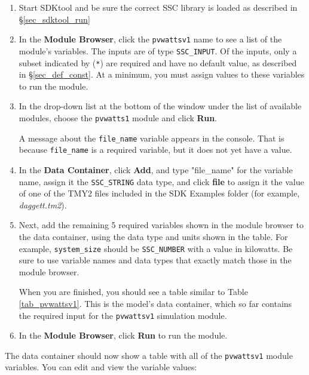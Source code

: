 \documentclass{scrartcl} %
\newcommand{\+}{\discretionary{\mbox{\scriptsize$\hookleftarrow$}}{}{}}
\begin{document}
\begin{enumerate}
\item Start SDKtool and be sure the correct SSC library is loaded as described in \S\ref{sec_sdktool_run}

\item In the \textbf{Module Browser}, click the \texttt{pvwattsv1} name to see a list of the module's variables. The inputs are of type \texttt{SSC\_INPUT}. Of the inputs, only a subset indicated by (\texttt{*}) are required and have no default value, as described in \S\ref{sec_def_const}. At a minimum, you must assign values to these variables to run the module.

\item In the drop-down list at the bottom of the window under the list of available modules, choose the \texttt{pvwatts1} module and click \textbf{Run}.

A message about the \texttt{file\_name} variable appears in the console. That is because \texttt{file\_name} is a required variable, but it does not yet have a value.

\item In the \textbf{Data Container}, click \textbf{Add}, and type "file\_name" for the variable name, assign it the \texttt{SSC\_STRING} data type, and click \textbf{file} to assign it the value of one of the TMY2 files included in the SDK Examples folder (for example, \textit{daggett.tm2}).

\item Next, add the remaining 5 required variables shown in the module browser to the data container, using the data type and units shown in the table. For example, \texttt{system\_size} should be \texttt{SSC\_NUMBER} with a value in kilowatts. Be sure to use variable names and data types that exactly match those in the module browser.

When you are finished, you should see a table similar to Table \ref{tab_pvwattsv1}. This is the model's data container, which so far contains the required input for the \texttt{pvwattsv1} simulation module.

\item In the \textbf{Module Browser}, click \textbf{Run} to run the module. 
\end{enumerate}

The data container should now show a table with all of the \texttt{pvwattsv1} module variables. You can edit and view the variable values:
\end{document}
